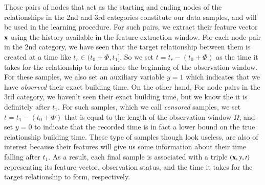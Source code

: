 Those pairs of nodes that act as the starting and ending nodes of the relationships in the 2nd and 3rd categories constitute our data samples, and will be used in the learning procedure. For such pairs, we extract their feature vector $\mathbf{x}$ using the history available in the feature extraction window. For each node pair in the 2nd category, we have seen that the target relationship between them is created at a time like $t_r\in(t_0+\Phi,t_1]$. So we set $t=t_r-(t_0+\Phi)$ as the time it takes for the relationship to form since the beginning of the observation window. For these samples, we also set an auxiliary variable $y=1$ which indicates that we have \emph{observed} their exact building time. On the other hand, For node pairs in the 3rd category, we haven't seen their exact building time, but we know the it is definitely after $t_1$. For such samples, which we call \emph{censored} samples, we set $t=t_1-(t_0+\Phi)$ that is equal to the length of the observation window $\Omega$, and set $y=0$ to indicate that the recorded time is in fact a lower bound on the true relationship building time. These type of samples though look useless, are also of interest because their features will give us some information about their time falling after $t_1$. As a result, each final sample is associated with a triple $(\mathbf{x},y,t)$ representing its feature vector, observation status, and the time it takes for the target relationship to form, respectively.



